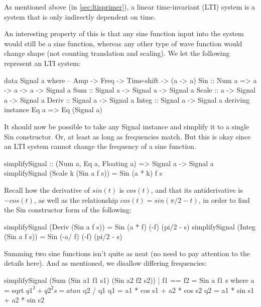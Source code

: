 \begin{modtext}
As mentioned above (in \ref{sec:ltisprimer}), a linear time-invariant (LTI) system is a system that is only indirectly dependent on time.\iffalse More precisely, input signals may be linearly combined (superposed) or differentiated/integrated with respect to time. 
(As discussed (in \ref{sec:tf}), we can describe how an LTI system transforms an input signal to the output signal with a transfer function).\fi
\end{modtext}
An interesting property of this is that any sine function input into the system would still be a sine function, whereas any other type of wave function would change shape (not counting translation and scaling).
We let the following represent an LTI system:
\begin{code}
data Signal a where
  -- Amp -> Freq -> Time-shift -> (a -> a)
  Sin   :: Num a => a -> a -> a -> Signal a
  Sum   :: Signal a -> Signal a -> Signal a
  Scale :: a -> Signal a -> Signal a
  Deriv :: Signal a -> Signal a
  Integ :: Signal a -> Signal a
deriving instance Eq a => Eq (Signal a)
\end{code}
It should now be possible to take any Signal instance and simplify it to a single Sin constructor. Or, at least as long as frequencies match. But this is okay since an LTI system cannot change the frequency of a sine function.
\begin{code}
simplifySignal :: (Num a, Eq a, Floating a) => Signal a -> Signal a
simplifySignal (Scale k (Sin a f s)) = Sin (a * k) f s
\end{code}
Recall how the derivative of $sin(t)$ is $cos(t)$, and that its antiderivative is $-cos(t)$, as well as the relationship $cos(t)=sin(\pi/2-t)$, in order to find the Sin constructor form of the following:
\begin{code}
simplifySignal (Deriv   (Sin a f s)) = Sin (a * f) (-f) (pi/2 - s)
simplifySignal (Integ   (Sin a f s)) = Sin (-a/ f) (-f) (pi/2 - s)
\end{code}
Summing two sine functions isn't quite as neat (no need to pay attention to the details here). And as mentioned, we disallow differing frequencies:
\begin{code}
simplifySignal (Sum (Sin a1 f1 s1)
                    (Sin a2 f2 s2)) | f1 == f2 = Sin a f1 s where
                      a = sqrt $ q1 ^ 2 + q2 ^ 2
                      s = atan $ q2 / q1
                      q1 = a1 * cos s1 + a2 * cos s2
                      q2 = a1 * sin s1 + a2 * sin s2
\end{code}
